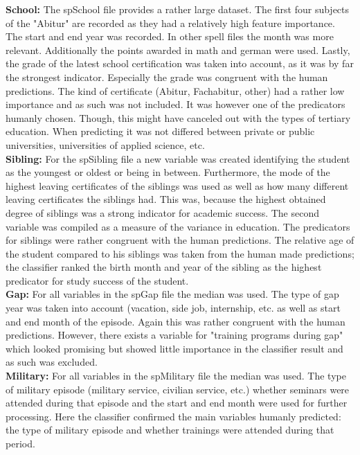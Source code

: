 \noindent\textbf{School:} The spSchool file provides a rather large dataset. The first four subjects of the "Abitur" are recorded as they had a relatively high feature importance. The start and end year was recorded. In other spell files the month was more relevant. Additionally the points awarded in math and german were used. Lastly, the grade of the latest school certification was taken into account, as it was by far the strongest indicator. Especially the grade was congruent with the human predictions. The kind of certificate (Abitur, Fachabitur, other) had a rather low importance and as such was not included. It was however one of the predicators humanly chosen. Though, this might have canceled out with the types of tertiary education. When predicting it was not differed between private or public universities, universities of applied science, etc.
\\
\textbf{Sibling:} For the spSibling file a new variable was created identifying the student as the youngest or oldest or being in between. Furthermore, the mode of the highest leaving certificates of the siblings was used as well as how many different leaving certificates the siblings had. This was, because the highest obtained degree of siblings was a strong indicator for academic success. The second variable was compiled as a measure of the variance in education. The predicators for siblings were rather congruent with the human predictions. The relative age of the student compared to his siblings was taken from the human made predictions; the classifier ranked the birth month and year of the sibling as the highest predicator for study success of the student.
\\
\textbf{Gap:} For all variables in the spGap file the median was used. The type of gap year was taken into account (vacation, side job, internship, etc. as well as start and end month of the episode. Again this was rather congruent with the human predictions. However, there exists a variable for "training programs during gap" which looked promising but showed little importance in the classifier result and as such was excluded.
\\
\textbf{Military:} For all variables in the spMilitary file the median was used. The type of military episode (military service, civilian service, etc.) whether seminars were attended during that episode and the start and end month were used for further processing. Here the classifier confirmed the main variables humanly predicted: the type of military episode and whether trainings were attended during that period.
